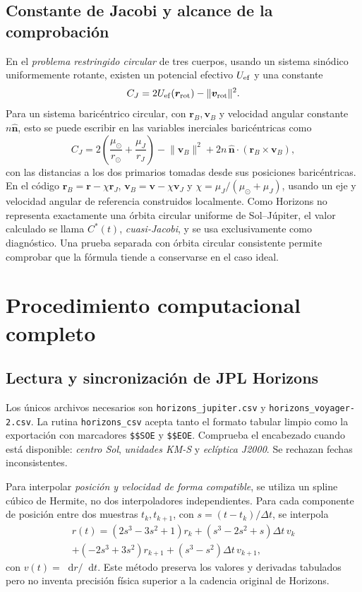 \documentclass[11pt,a4paper]{article}
\newcommand{\vect}[1]{\bm{#1}}
\newcommand{\dif}{\mathop{}\!\mathrm{d}}
\newcommand{\muS}{\mu_\odot}
\newcommand{\muJ}{\mu_{J}}
\newcommand{\rJ}{\vect r_{J}}
\newcommand{\vJ}{\vect v_{J}}
\begin{document}
\subsection{Constante de Jacobi y alcance de la comprobación}
En el \emph{problema restringido circular} de tres cuerpos, usando un sistema sinódico uniformemente rotante, existen un potencial efectivo $U_{\rm ef}$ y una constante
\begin{equation}\label{eq:jacobi}
C_J=2U_{\rm ef}(\vect r_{\rm rot})-\lVert\vect v_{\rm rot}\rVert^2.
\end{equation}
Para un sistema baricéntrico circular, con $\vect r_B,\vect v_B$ y velocidad angular constante $n\widehat{\vect n}$, esto se puede escribir en las variables inerciales baricéntricas como
\begin{equation}\label{eq:cstar}
C_J=2\left(\frac{\muS}{r_\odot}+\frac{\muJ}{r_J}\right)
-\lVert\vect v_B\rVert^2+2n\,\widehat{\vect n}\cdot(\vect r_B\times\vect v_B),
\end{equation}
con las distancias a los dos primarios tomadas desde sus posiciones baricéntricas. En el código $\vect r_B=\vect r-\chi\rJ$, $\vect v_B=\vect v-\chi\vJ$ y $\chi=\muJ/(\muS+\muJ)$, usando un eje y velocidad angular de referencia construidos localmente. Como Horizons no representa exactamente una órbita circular uniforme de Sol--Júpiter, el valor calculado se llama $C^*(t)$, \emph{cuasi-Jacobi}, y se usa exclusivamente como diagnóstico. Una prueba separada con órbita circular consistente permite comprobar que la fórmula tiende a conservarse en el caso ideal.

\section{Procedimiento computacional completo}
\subsection{Lectura y sincronización de JPL Horizons}
Los únicos archivos necesarios son \texttt{horizons\_jupiter.csv} y \texttt{horizons\_voyager-2.csv}. La rutina \texttt{horizons\_csv} acepta tanto el formato tabular limpio como la exportación con marcadores \texttt{\$\$SOE} y \texttt{\$\$EOE}. Comprueba el encabezado cuando está disponible: \emph{centro Sol}, \emph{unidades KM-S} y \emph{eclíptica J2000}. Se rechazan fechas inconsistentes.

Para interpolar \emph{posición y velocidad de forma compatible}, se utiliza un spline cúbico de Hermite, no dos interpoladores independientes. Para cada componente de posición entre dos muestras $t_k,t_{k+1}$, con $s=(t-t_k)/\Delta t$, se interpola
\begin{multline}\label{eq:hermite}
r(t)=(2s^3-3s^2+1)r_k+ (s^3-2s^2+s)\Delta t\,v_k\\
+(-2s^3+3s^2)r_{k+1}+(s^3-s^2)\Delta t\,v_{k+1},
\end{multline}
con $v(t)=\dif r/\dif t$. Este método preserva los valores y derivadas tabulados pero no inventa precisión física superior a la cadencia original de Horizons.
\end{document}
